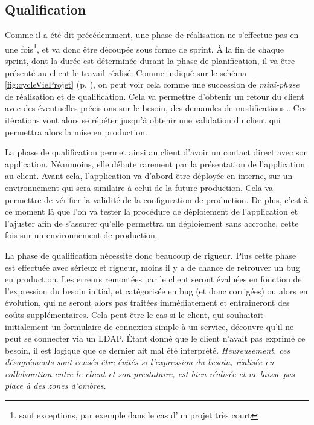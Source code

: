\subsection{Qualification}

Comme il a été dit précédemment, une phase de réalisation ne s'effectue pas en une fois\footnote{sauf exceptions, par exemple dans le cas d'un projet très court}, et va donc être découpée sous forme de sprint. À la fin de chaque sprint, dont la durée est déterminée durant la phase de planification, il va être présenté au client le travail réalisé. Comme indiqué sur le schéma \ref{fig:cycleVieProjet} (p. \pageref{fig:cycleVieProjet}), on peut voir cela comme une succession de \emph{mini-phase} de réalisation et de qualification. Cela va permettre d'obtenir un retour du client avec des éventuelles précisions sur le besoin, des demandes de modifications\ldots{} Ces itérations vont alors se répéter jusqu'à obtenir une validation du client qui permettra alors la mise en production.

La phase de qualification permet ainsi au client d'avoir un contact direct avec son application. Néanmoins, elle débute rarement par la présentation de l'application au client. Avant cela, l'application va d'abord être déployée en interne, sur un environnement qui sera similaire à celui de la future production. Cela va permettre de vérifier la validité de la configuration de production. De plus, c'est à ce moment là que l'on va tester la procédure de déploiement de l'application et l'ajuster afin de s'assurer qu'elle permettra un déploiement sans accroche, cette fois sur un environnement de production.

La phase de qualification nécessite donc beaucoup de rigueur. Plus cette phase est effectuée avec sérieux et rigueur, moins il y a de chance de retrouver un bug en production. Les erreurs remontées par le client seront évaluées en fonction de l'expression du besoin initial, et catégorisée en bug (et donc corrigées) ou alors en évolution, qui ne seront alors pas traitées immédiatement et entraineront des coûts supplémentaires. Cela peut être le cas si le client, qui souhaitait initialement un formulaire de connexion simple à un service, découvre qu'il ne peut se connecter via un \gls{LDAP}. Étant donné que le client n'avait pas exprimé ce besoin, il est logique que ce dernier ait mal été interprété. \emph{Heureusement, ces désagréments sont censés être évités si l'expression du besoin, réalisée en collaboration entre le client et son prestataire, est bien réalisée et ne laisse pas place à des zones d'ombres.}

